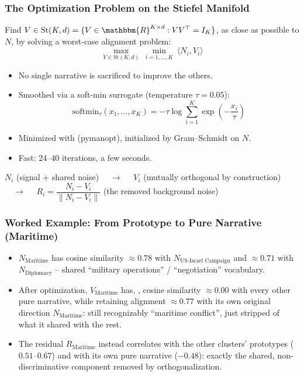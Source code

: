 \documentclass[8pt,leqno,xcolor={dvipsnames,table},aspectratio=169]{beamer}
\newenvironment{squaredblock}[2]{%
\begin{tcolorbox}[colback=adia!15,colframe=adia!85!black,title={#1}]%
#2}{\end{tcolorbox}}
\def\polbf#1{{\color{adia}{\bf #1}}}
\def\R{\mathbbm{R}}
\begin{document}
\begin{frame}
  \frametitle{The Optimization Problem on the Stiefel Manifold}

  Find $V \in \text{St}(K,d) = \{V \in \R^{K\times d}: VV^\top = I_K\}$, as
  close as possible to $N$, by solving a worst-case alignment problem:
  \[
  \max_{V \in \text{St}(K,d)} \ \min_{i=1,\dots,K} \ \langle N_i, V_i\rangle
  \]
  \begin{itemize}
    \item No single narrative is sacrificed to improve the others.
    \item Smoothed via a soft-min surrogate (temperature $\tau=0.05$):
    \[
    \text{softmin}_\tau(x_1,\dots,x_K) = -\tau \log \sum_{i=1}^K \exp\left(-\frac{x_i}{\tau}\right)
    \]
    \item Minimized with \polbf{Riemannian conjugate gradient} (pymanopt),
      initialized by Gram--Schmidt on $N$.
    \item Fast: 24--40 iterations, a few seconds.
  \end{itemize}

  \vspace{.5em}
  \begin{squaredblock}{Three comparable objects per cluster $i$}
  \small
  \polbf{Prototype} $N_i$ (signal + shared noise) $\quad\to\quad$
  \polbf{Pure narrative} $V_i$ (mutually orthogonal by construction)
  $\quad\to\quad$ \polbf{Residual} $R_i = \dfrac{N_i - V_i}{\lVert N_i - V_i\rVert}$ (the removed background noise)
  \end{squaredblock}
\end{frame}

\begin{frame}
  \frametitle{Worked Example: From Prototype to Pure Narrative (Maritime)}

  \begin{itemize}
    \item $N_{\text{Maritime}}$ has cosine similarity $\approx 0.78$ with
      $N_{\text{US-Israel Campaign}}$ and $\approx 0.71$ with
      $N_{\text{Diplomacy}}$ -- shared ``military operations'' /
      ``negotiation'' vocabulary.
    \item After optimization, $V_{\text{Maritime}}$ has, \polbf{by
      construction}, cosine similarity $\approx 0.00$ with every other pure
      narrative, while retaining alignment $\approx 0.77$ with its own
      original direction $N_{\text{Maritime}}$: still recognizably
      ``maritime conflict'', just stripped of what it shared with the rest.
    \item The residual $R_{\text{Maritime}}$ instead correlates
      \polbf{positively} with the other clusters' prototypes ($0.51$--$0.67$)
      and \polbf{negatively} with its own pure narrative ($-0.48$): exactly
      the shared, non-discriminative component removed by orthogonalization.
  \end{itemize}
\end{frame}
\end{document}
